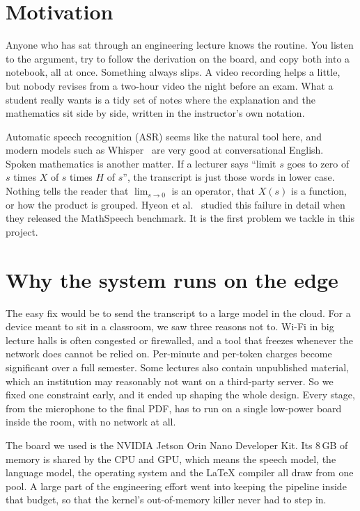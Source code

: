 \documentclass[11pt,a4paper,oneside]{report}
\theoremstyle{definition}
\begin{document}
\section{Motivation}
Anyone who has sat through an engineering lecture knows the routine. You listen to the argument, try to follow the derivation on the board, and copy both into a notebook, all at once. Something always slips. A video recording helps a little, but nobody revises from a two-hour video the night before an exam. What a student really wants is a tidy set of notes where the explanation and the mathematics sit side by side, written in the instructor's own notation.

Automatic speech recognition (ASR) seems like the natural tool here, and modern models such as Whisper~\cite{radford2023whisper} are very good at conversational English. Spoken mathematics is another matter. If a lecturer says ``limit $s$ goes to zero of $s$ times $X$ of $s$ times $H$ of $s$'', the transcript is just those words in lower case. Nothing tells the reader that $\lim_{s\to0}$ is an operator, that $X(s)$ is a function, or how the product is grouped. Hyeon et al.~\cite{hyeon2025mathspeech} studied this failure in detail when they released the MathSpeech benchmark. It is the first problem we tackle in this project.

\section{Why the system runs on the edge}
The easy fix would be to send the transcript to a large model in the cloud. For a device meant to sit in a classroom, we saw three reasons not to. Wi-Fi in big lecture halls is often congested or firewalled, and a tool that freezes whenever the network does cannot be relied on. Per-minute and per-token charges become significant over a full semester. Some lectures also contain unpublished material, which an institution may reasonably not want on a third-party server. So we fixed one constraint early, and it ended up shaping the whole design. Every stage, from the microphone to the final PDF, has to run on a single low-power board inside the room, with no network at all.

The board we used is the NVIDIA Jetson Orin Nano Developer Kit. Its 8\,GB of memory is shared by the CPU and GPU, which means the speech model, the language model, the operating system and the LaTeX compiler all draw from one pool. A large part of the engineering effort went into keeping the pipeline inside that budget, so that the kernel's out-of-memory killer never had to step in.
\end{document}
